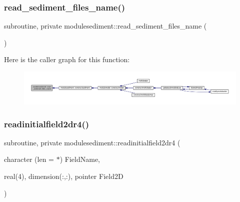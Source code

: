\subsubsection{\texorpdfstring{read\+\_\+sediment\+\_\+files\+\_\+name()}{read\_sediment\_files\_name()}}
{\footnotesize\ttfamily subroutine, private modulesediment\+::read\+\_\+sediment\+\_\+files\+\_\+name (\begin{DoxyParamCaption}{ }\end{DoxyParamCaption})\hspace{0.3cm}{\ttfamily [private]}}

Here is the caller graph for this function\+:\nopagebreak
\begin{figure}[H]
\begin{center}
\leavevmode
\includegraphics[width=350pt]{namespacemodulesediment_ae14a9f4cd6513444502e3774b27d6f2e_icgraph}
\end{center}
\end{figure}
\mbox{\label{namespacemodulesediment_a03d5ef49dd68eafdac5c93dab6c4e8de}} 
\subsubsection{\texorpdfstring{readinitialfield2dr4()}{readinitialfield2dr4()}}
{\footnotesize\ttfamily subroutine, private modulesediment\+::readinitialfield2dr4 (\begin{DoxyParamCaption}\item[{character (len = $\ast$)}]{Field\+Name,  }\item[{real(4), dimension(\+:,\+:), pointer}]{Field2D }\end{DoxyParamCaption})\hspace{0.3cm}{\ttfamily [private]}}

\mbox{\label{namespacemodulesediment_a260a1cba073b46d204c52ec103eb9f30}} 
